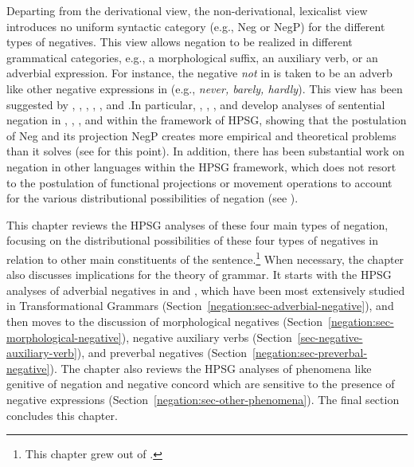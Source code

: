 \documentclass[output=paper
 	        ,biblatex
                ,babelshorthands
                ,newtxmath
                ,draftmode
                ,colorlinks, citecolor=brown
]{langscibook}
\begin{document}
Departing from the derivational view, the non-derivational, lexicalist view
introduces no uniform syntactic category (e.g., Neg or NegP) for the different types of negatives. This view allows negation to be realized in different grammatical categories, e.g., a morphological suffix, an auxiliary verb, or an adverbial expression. For instance, the negative \emph{not} in  is taken to be an adverb like other negative expressions in  (e.g., \textit{never, barely, hardly}). This view has been suggested by \citet{Jackendoff:72}, \citet{Baker:91}, \citet{Ernst:92}, \citet{AG:97}, \citet{Kim:00}, and \citet{Warner2000a-u}.\addpages In particular,
\citet{KS:96}, \citet{AG:97}, \citet{Kim:00}, and \citet{KS:02} develop analyses of sentential negation in , , , and  within the framework of HPSG, showing that the postulation of Neg and its projection NegP creates more empirical and theoretical problems than it solves (see \citealt{Newmeyer:2006} for this point).
In addition, there has been substantial work on negation in other languages within the HPSG framework, which
does not resort to the postulation of functional projections or movement operations to account for the various distributional possibilities
of negation (see \citealt{PK:99, BJ:00, Prz:00, Kupsc:02, Swart:02, Borsley:05, Crysmann:10, Bender:13}).

This chapter reviews the HPSG analyses of these four main types of negation,
focusing on the distributional possibilities of these four types of negatives in
relation to other main constituents of the sentence.\footnote{This chapter grew out of \citet{Kim:00,kim:18}.} When
necessary, the chapter also discusses implications for
the theory of grammar.
It starts with the HPSG analyses of adverbial negatives in  and , which
have been most extensively studied in Transformational Grammars (Section~\ref{negation:sec-adverbial-negative}),
and then moves to the discussion of morphological
negatives (Section~\ref{negation:sec-morphological-negative}), negative auxiliary verbs
(Section~\ref{sec-negative-auxiliary-verb}), and preverbal negatives (Section~\ref{negation:sec-preverbal-negative}). The chapter
also reviews the HPSG analyses of phenomena like genitive of negation and
negative concord which are sensitive to the presence of negative expressions (Section~\ref{negation:sec-other-phenomena}). The
final section concludes this chapter.
\end{document}

